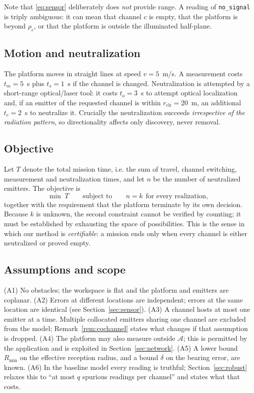 \documentclass[preprint,12pt,3p]{elsarticle}
\theoremstyle{definition}
\newcommand{\Rmin}{R_{\min}}
\newcommand{\bA}{\mathcal{A}}
\begin{document}
Note that \eqref{eq:sensor} deliberately does \emph{not} provide range. A reading of
\texttt{no\_signal} is triply ambiguous: it can mean that channel $c$ is empty, that the platform
is beyond $\rho_c$, or that the platform is outside the illuminated half-plane.

\subsection{Motion and neutralization}
The platform moves in straight lines at speed $v=5$~m/s. A measurement costs $t_m=5$~s plus
$t_s=1$~s if the channel is changed. Neutralization is attempted by a short-range optical/laser
tool: it costs $t_o=3$~s to attempt optical localization and, if an emitter of the requested
channel is within $r_{\mathrm{clr}}=20$~m, an additional $t_c=2$~s to neutralize it. Crucially the
neutralization succeeds \emph{irrespective of the radiation pattern}, so directionality affects
only discovery, never removal.

\subsection{Objective}
Let $T$ denote the total mission time, i.e. the sum of travel, channel switching, measurement and
neutralization times, and let $n$ be the number of neutralized emitters. The objective is
\begin{equation}
\min \; T \qquad\text{subject to}\qquad n=k\ \ \text{for every realization,}
\label{eq:objective}
\end{equation}
together with the requirement that the platform terminate by its own decision. Because $k$ is
unknown, the second constraint cannot be verified by counting; it must be established by
exhausting the space of possibilities. This is the sense in which our method is \emph{certifiable}:
a mission ends only when every channel is either neutralized or proved empty.

\subsection{Assumptions and scope}
(A1) No obstacles; the workspace is flat and the platform and emitters are coplanar.
(A2) Errors at different locations are independent; errors at the same location are identical
(see Section~\ref{sec:sensor}).
(A3) A channel hosts at most one emitter at a time. Multiple collocated emitters sharing one
channel are excluded from the model; Remark~\ref{rem:cochannel} states what changes if that
assumption is dropped.
(A4) The platform may also measure outside $\bA$; this is permitted by the application and is
exploited in Section~\ref{sec:network}.
(A5) A lower bound $\Rmin$ on the effective reception radius, and a bound $\delta$ on the bearing
error, are known.
(A6) In the baseline model every reading is truthful; Section~\ref{sec:robust} relaxes this to
``at most $q$ spurious readings per channel'' and states what that costs.
\end{document}
